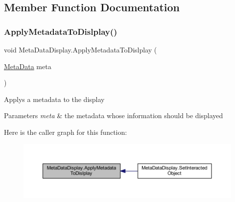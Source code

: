 \subsection{Member Function Documentation}
\mbox{\label{class_meta_data_display_ab982cb6123576aff6eae89a859899ad0}} 
\subsubsection{\texorpdfstring{Apply\+Metadata\+To\+Dislplay()}{ApplyMetadataToDislplay()}}
{\footnotesize\ttfamily void Meta\+Data\+Display.\+Apply\+Metadata\+To\+Dislplay (\begin{DoxyParamCaption}\item[{\mbox{\hyperlink{class_meta_data}{Meta\+Data}}}]{meta }\end{DoxyParamCaption})\hspace{0.3cm}{\ttfamily [private]}}



Applys a metadata to the display 


\begin{DoxyParams}{Parameters}
{\em meta} & the metadata whose information should be displayed\\
\hline
\end{DoxyParams}
Here is the caller graph for this function\+:\nopagebreak
\begin{figure}[H]
\begin{center}
\leavevmode
\includegraphics[width=350pt]{class_meta_data_display_ab982cb6123576aff6eae89a859899ad0_icgraph}
\end{center}
\end{figure}
\mbox{\label{class_meta_data_display_a45d9e14c784a8526dafd62f8efec02a7}} 
